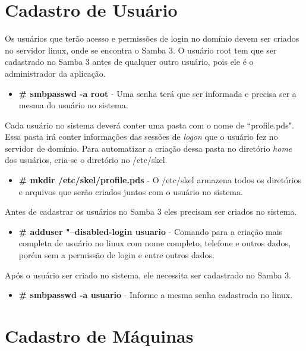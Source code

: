 \section{Cadastro de Usuário}

Os usuários que terão acesso e permissões de login no domínio devem ser criados no servidor linux, onde se encontra o Samba 3. O usuário root tem que ser cadastrado no Samba 3 antes de qualquer outro usuário, pois ele é o administrador da aplicação.

\begin{itemize}
	\item \textbf {\# smbpasswd -a root} - Uma senha terá que ser informada e precisa ser a mesma do usuário no sistema.
\end{itemize}

Cada usuário no sistema deverá conter uma pasta com o nome de ``profile.pds". Essa pasta irá conter informações das sessões de \textit{logon} que o usuário fez no servidor de domínio. Para automatizar a criação dessa pasta no diretório \textit{home} dos usuários, cria-se o diretório no /etc/skel.

\begin{itemize}
	\item \textbf{\# mkdir /etc/skel/profile.pds} - O /etc/skel armazena todos os diretórios e arquivos que serão criados juntos com o usuário no sistema.
\end{itemize}

Antes de cadastrar os usuários no Samba 3 eles precisam ser criados no sistema.

\begin{itemize}
	\item \textbf{\# adduser "--disabled-login usuario} - Comando para a criação mais completa de usuário no linux com nome completo, telefone e outros dados, porém sem a permissão de login e entre outros dados.
\end{itemize}

Após o usuário ser criado no sistema, ele necessita ser cadastrado no Samba 3.

\begin{itemize}
	\item \textbf{\# smbpasswd -a usuario} - Informe a mesma senha cadastrada no linux.
\end{itemize}

\section{Cadastro de Máquinas}

